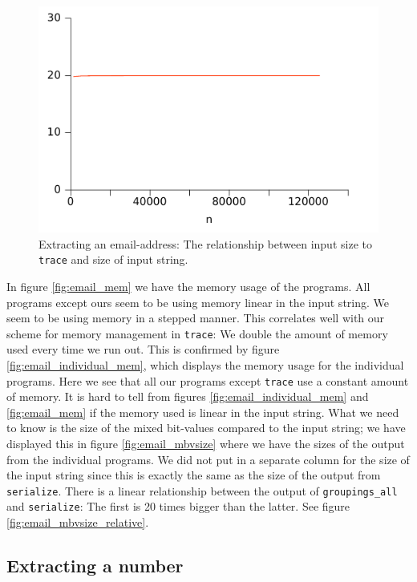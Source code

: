 \begin{figure}
\centering
\includegraphics{benchmarks/memory/email_mbvsize_relative.pdf}
\caption{Extracting an email-address: The relationship between input
  size to \texttt{trace} and size of input string.}
\label{fig:email_mbvsize_relative}
\end{figure}


In figure \vref{fig:email_mem} we have the memory usage of the
programs. All programs except ours seem to be using memory linear in
the input string. We seem to be using memory in a stepped manner. This
correlates well with our scheme for memory management in
\texttt{trace}: We double the amount of memory used every time we run
out. This is confirmed by figure \vref{fig:email_individual_mem},
which displays the memory usage for the individual programs. Here we
see that all our programs except \texttt{trace} use a constant amount
of memory. It is hard to tell from figures
\ref{fig:email_individual_mem} and \vref{fig:email_mem} if the memory
used is linear in the input string. What we need to know is the size
of the mixed bit-values compared to the input string; we have
displayed this in figure \vref{fig:email_mbvsize} where we have the sizes
of the output from the individual programs. We did not put in a
separate column for the size of the input string since this is
exactly the same as the size of the output from
\texttt{serialize}. There is a linear relationship between the output
of \texttt{groupings\_all} and \texttt{serialize}: The first is 20
times bigger than the latter. See figure
\vref{fig:email_mbvsize_relative}.

\subsection{Extracting a number}

